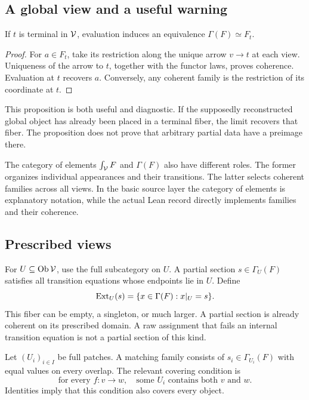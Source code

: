 \subsection{A global view and a useful warning}
\begin{proposition}\label{KS03}
If \(t\) is terminal in \(\mathcal V\), evaluation induces an equivalence \(\Gamma(F)\simeq F_t\).
\end{proposition}
\begin{proof}
For \(a\in F_t\), take its restriction along the unique arrow \(v\to t\) at each view. Uniqueness of the arrow to \(t\), together with the functor laws, proves coherence. Evaluation at \(t\) recovers \(a\). Conversely, any coherent family is the restriction of its coordinate at \(t\).
\end{proof}
This proposition is both useful and diagnostic. If the supposedly reconstructed global object has already been placed in a terminal fiber, the limit recovers that fiber. The proposition does not prove that arbitrary partial data have a preimage there.

The category of elements \(\int_\mathcal V F\) and \(\Gamma(F)\) also have different roles. The former organizes individual appearances and their transitions. The latter selects coherent families across all views. In the basic source layer the category of elements is explanatory notation, while the actual Lean record directly implements families and their coherence.

\label{sec:glue}
\subsection{Prescribed views}
For \(U\subseteq\operatorname{Ob}\mathcal V\), use the full subcategory on \(U\). A partial section \(s\in\Gamma_U(F)\) satisfies all transition equations whose endpoints lie in \(U\). Define
\begin{equation}\label{eq:extension}
 \operatorname{Ext}_U(s)=\{x\in\Gamma(F):x|_U=s\}.
\end{equation}
This fiber can be empty, a singleton, or much larger. A partial section is already coherent on its prescribed domain. A raw assignment that fails an internal transition equation is not a partial section of this kind.

Let \((U_i)_{i\in I}\) be full patches. A matching family consists of \(s_i\in\Gamma_{U_i}(F)\) with equal values on every overlap. The relevant covering condition is
\begin{equation}\label{eq:transitioncover}
 \text{for every }f:v\to w,\quad
 \text{some }U_i\text{ contains both }v\text{ and }w.
\end{equation}
Identities imply that this condition also covers every object.

